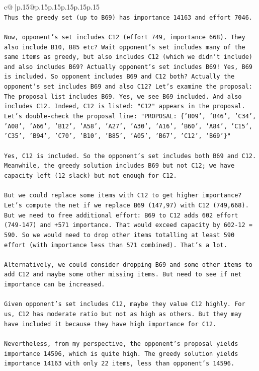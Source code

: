 \documentclass{article}
\begin{document}
{\begin{supertabular}{c@{$\;$}|p{.15\linewidth}@{}p{.15\linewidth}p{.15\linewidth}p{.15\linewidth}p{.15\linewidth}p{.15\linewidth}}
{{{\\ 
\texttt{Thus the greedy set (up to B69) has importance 14163 and effort 7046.} \\
\\ 
\texttt{Now, opponent's set includes C12 (effort 749, importance 668). They also include B10, B85 etc? Wait opponent's set includes many of the same items as greedy, but also includes C12 (which we didn't include) and also includes B69? Actually opponent's set includes B69! Yes, B69 is included. So opponent includes B69 and C12 both? Actually the opponent's set includes B69 and also C12? Let's examine the proposal: The proposal list includes B69. Yes, we see B69 included. And also includes C12. Indeed, C12 is listed: "C12" appears in the proposal. Let's double{-}check the proposal line: "PROPOSAL: \{'B09', 'B46', 'C34', 'A08', 'A66', 'B12', 'A58', 'A27', 'A30', 'A16', 'B60', 'A84', 'C15', 'C35', 'B94', 'C70', 'B10', 'B85', 'A05', 'B67', 'C12', 'B69'\}"} \\
\\ 
\texttt{Yes, C12 is included. So the opponent's set includes both B69 and C12. Meanwhile, the greedy solution includes B69 but not C12; we have capacity left (12 slack) but not enough for C12.} \\
\\ 
\texttt{But we could replace some items with C12 to get higher importance? Let's compute the net if we replace B69 (147,97) with C12 (749,668). But we need to free additional effort: B69 to C12 adds 602 effort (749{-}147) and +571 importance. That would exceed capacity by 602{-}12 = 590. So we would need to drop other items totalling at least 590 effort (with importance less than 571 combined). That's a lot.} \\
\\ 
\texttt{Alternatively, we could consider dropping B69 and some other items to add C12 and maybe some other missing items. But need to see if net importance can be increased.} \\
\\ 
\texttt{Given opponent's set includes C12, maybe they value C12 highly. For us, C12 has moderate ratio but not as high as others. But they may have included it because they have high importance for C12.} \\
\\ 
\texttt{Nevertheless, from my perspective, the opponent's proposal yields importance 14596, which is quite high. The greedy solution yields importance 14163 with only 22 items, less than opponent's 14596.} \\
}}}
\end{supertabular}}
\end{document}
